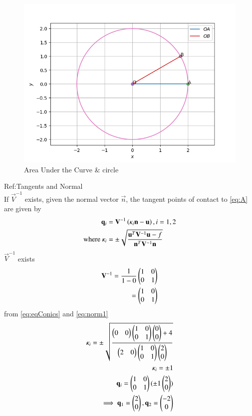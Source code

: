 \documentclass[journal,12pt,twocolumn]{IEEEtran}
\begin{document}
\begin{figure}[H]
\centering
\includegraphics[width=\columnwidth]{circle.png}
\caption{Area Under the Curve & circle  }
\label{fig:1}
\end{figure}
Ref:Tangents and Normal \\
If $\vec{V}^{-1}$ exists, given the normal vector $\vec{n}$, the tangent points of contact to \eqref{eq:A} are given by
\begin{align}
    \mathbf{q}_i &= \mathbf{V}^{-1}\left(\kappa_i \mathbf{n}-\mathbf{u}\right), i = 1,2
\\
\text{where }\kappa_i &= \pm \sqrt{
\frac{\mathbf{u}^T\mathbf{V}^{-1}\mathbf{u}-f}{\mathbf{n}^T\mathbf{V}^{-1}\mathbf{n}}}
\label{eq:eqConics}
\end{align}
$\vec{V}^{-1}$ exists 
\begin{align}
    \mathbf{V}^{-1} = \frac{1}{1-0} \begin{pmatrix}1&0 \\ 0&1\end{pmatrix}\\
    =  \begin{pmatrix}1&0 \\ 0&1\end{pmatrix}
\end{align}
from \eqref{eq:eqConics} and \eqref{eq:norm1}
\begin{align}
\kappa_i = \pm \sqrt{
\frac{\begin{pmatrix}0&0\end{pmatrix}\begin{pmatrix}1&0\\0&1\end{pmatrix}\begin{pmatrix}0\\0\end{pmatrix}+4}{\begin{pmatrix}2&0\end{pmatrix}\begin{pmatrix}1&0\\0&1\end{pmatrix}\begin{pmatrix}2\\0\end{pmatrix}}}\\
    \kappa_i = \pm 1  \\
    \mathbf{q}_i = \begin{pmatrix}1&0 \\0&1\end{pmatrix} (\pm 1 \begin{pmatrix}2\\0\end{pmatrix}) \\
    \implies \mathbf{q}_1 =\begin{pmatrix}2 \\0\end{pmatrix} ,
    \mathbf{q}_2 =\begin{pmatrix}-2\\ 0\end{pmatrix}
\end{align}
\end{document}
